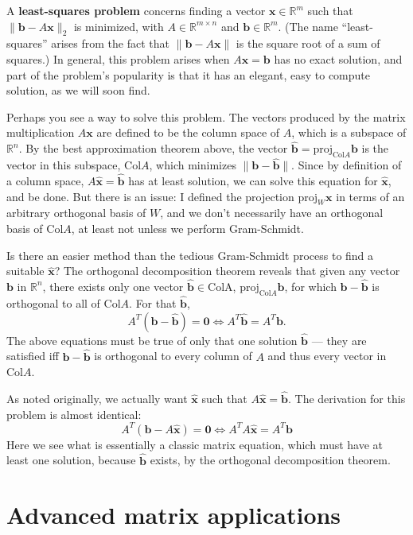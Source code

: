 \documentclass[draft,12pt]{report}
\renewcommand{\vec}[1]{\mathbf{#1}}
\begin{document}
A \textbf{least-squares problem} concerns finding a vector $\vec{x} \in \mathbb R^m$ such that $\| \vec{b} - A\vec{x} \|_2$ is minimized, with $A \in \mathbb R^{m \times n}$ and $\vec{b} \in \mathbb R^m$. (The name ``least-squares'' arises from the fact that $\|\vec{b} - A\vec{x}\|$ is the square root of a sum of squares.) In general, this problem arises when $A\vec{x} = \vec{b}$ has no exact solution, and part of the problem's popularity is that it has an elegant, easy to compute solution, as we will soon find.

Perhaps you see a way to solve this problem. The vectors produced by the matrix multiplication $A\vec{x}$ are defined to be the column space of $A$, which is a subspace of $\mathbb R^n$. By the best approximation theorem above, the vector $\vec{\hat{b}} = \mathrm{proj}_{\mathrm{Col } A} \vec{b}$ is the vector in this subspace, $\mathrm{Col } A$, which minimizes $\| \vec{b} - \vec{\hat{b}} \|$. Since by definition of a column space, $A\vec{\hat{x}} = \vec{\hat{b}}$ has at least solution, we can solve this equation for $\vec{\hat{x}}$, and be done. But there is an issue: I defined the projection $\mathrm{proj}_W \vec{x}$ in terms of an arbitrary orthogonal basis of $W$, and we don't necessarily have an orthogonal basis of $\mathrm{Col } A$, at least not unless we perform Gram-Schmidt.

Is there an easier method than the tedious Gram-Schmidt process to find a suitable $\vec{\hat{x}}$? The orthogonal decomposition theorem reveals that given any vector $\vec{b}$ in $\mathbb R^n$, there exists only one vector $\vec{\hat{b}} \in \mathrm{Col A}$, $\mathrm{proj}_{\mathrm{Col } A} \vec{b}$, for which $\vec{b} - \vec{\hat{b}}$ is orthogonal to all of $\mathrm{Col } A$. For that $\vec{\hat{b}}$,
\[ A^T(\vec{b} - \vec{\hat{b}}) = \vec{0} \iff A^T \vec{\hat{b}} = A^T\vec{b}. \]
The above equations must be true of only that one solution $\vec{\hat{b}}$ --- they are satisfied iff $\vec{b} - \vec{\hat{b}}$ is orthogonal to every column of $A$ and thus every vector in $\mathrm{Col } A$.

As noted originally, we actually want $\vec{\hat{x}}$ such that $A\vec{\hat{x}} = \vec{\hat{b}}$. The derivation for this problem is almost identical:
\[ A^T(\vec{b} - A\vec{\hat{x}}) = \vec{0} \iff A^T A\vec{\hat{x}} = A^T\vec{b} \]
Here we see what is essentially a classic matrix equation, which must have at least one solution, because $\vec{\hat{b}}$ exists, by the orthogonal decomposition theorem.

\chapter{Advanced matrix applications}
\end{document}

